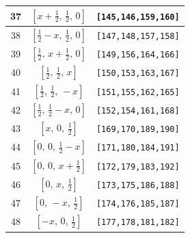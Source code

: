 \documentclass[fleqn,8pt]{jsarticle}
\begin{document}
\begin{longtable}{ccc}
37 & $\left[ x + \frac{1}{2},\, \frac{1}{2},\, 0 \right]$ & {\tt [145,146,159,160]} \\ \hline
38 & $\left[ \frac{1}{2} - x,\, \frac{1}{2},\, 0 \right]$ & {\tt [147,148,157,158]} \\ \hline
39 & $\left[ \frac{1}{2},\, x + \frac{1}{2},\, 0 \right]$ & {\tt [149,156,164,166]} \\ \hline
40 & $\left[ \frac{1}{2},\, \frac{1}{2},\, x \right]$ & {\tt [150,153,163,167]} \\ \hline
41 & $\left[ \frac{1}{2},\, \frac{1}{2},\, - x \right]$ & {\tt [151,155,162,165]} \\ \hline
42 & $\left[ \frac{1}{2},\, \frac{1}{2} - x,\, 0 \right]$ & {\tt [152,154,161,168]} \\ \hline
43 & $\left[ x,\, 0,\, \frac{1}{2} \right]$ & {\tt [169,170,189,190]} \\ \hline
44 & $\left[ 0,\, 0,\, \frac{1}{2} - x \right]$ & {\tt [171,180,184,191]} \\ \hline
45 & $\left[ 0,\, 0,\, x + \frac{1}{2} \right]$ & {\tt [172,179,183,192]} \\ \hline
46 & $\left[ 0,\, x,\, \frac{1}{2} \right]$ & {\tt [173,175,186,188]} \\ \hline
47 & $\left[ 0,\, - x,\, \frac{1}{2} \right]$ & {\tt [174,176,185,187]} \\ \hline
48 & $\left[ - x,\, 0,\, \frac{1}{2} \right]$ & {\tt [177,178,181,182]} \\
\end{longtable}
\renewcommand{\arraystretch}{1.2}
\end{document}

